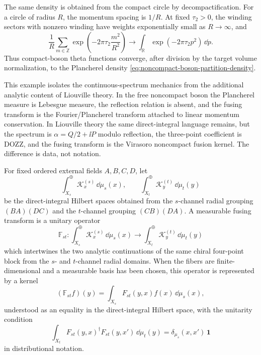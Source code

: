 The same density is obtained from the compact circle by decompactification.
For a circle of radius \(R\), the momentum spacing is \(1/R\).  At fixed
\(\tau_2>0\), the winding sectors with nonzero winding have weights
exponentially small as \(R\to\infty\), and
\[
  \frac1R\sum_{m\in\mathbb Z}
  \exp\!\left(-2\pi\tau_2\frac{m^2}{R^2}\right)
  \longrightarrow
  \int_{\mathbb R}\exp(-2\pi\tau_2p^2)\,\dd p .
\]
Thus compact-boson theta functions converge, after division by the target
volume normalization, to the Plancherel density
\eqref{eq:noncompact-boson-partition-density}.

This example isolates the continuous-spectrum mechanics from the additional
analytic content of Liouville theory.  In the free noncompact boson the
Plancherel measure is Lebesgue measure, the reflection relation is absent,
and the fusing transform is the Fourier/Plancherel transform attached to
linear momentum conservation.  In Liouville theory the same direct-integral
language remains, but the spectrum is
\(\alpha=Q/2+\ii P\) modulo reflection, the three-point coefficient is DOZZ,
and the fusing transform is the Virasoro noncompact fusion kernel.  The
difference is data, not notation.

\begin{definition}
\label{def:measurable-fusing-transform}
For fixed ordered external fields \(A,B,C,D\), let
\[
  \int_{X_s}^{\oplus}\mathcal K_x^{(s)}\,\dd\mu_s(x),
  \qquad
  \int_{X_t}^{\oplus}\mathcal K_y^{(t)}\,\dd\mu_t(y)
\]
be the direct-integral Hilbert spaces obtained from the \(s\)-channel
radial grouping \((BA)(DC)\) and the \(t\)-channel grouping \((CB)(DA)\).
A measurable fusing transform is a unitary operator
\begin{equation}
  \mathbb F_{st}:
  \int_{X_s}^{\oplus}\mathcal K_x^{(s)}\,\dd\mu_s(x)
  \longrightarrow
  \int_{X_t}^{\oplus}\mathcal K_y^{(t)}\,\dd\mu_t(y)
  \label{eq:measurable-fusing-transform}
\end{equation}
which intertwines the two analytic continuations of the same chiral
four-point block from the \(s\)- and \(t\)-channel radial domains.  When the
fibers are finite-dimensional and a measurable basis has been chosen, this
operator is represented by a kernel
\begin{equation}
  (\mathbb F_{st} f)(y)
  =
  \int_{X_s}
  F_{st}(y,x)f(x)\,\dd\mu_s(x),
  \label{eq:fusing-kernel-direct-integral}
\end{equation}
understood as an equality in the direct-integral Hilbert space, with the
unitarity condition
\begin{equation}
  \int_{X_t} F_{st}(y,x)^\dagger F_{st}(y,x')\,\dd\mu_t(y)
  =
  \delta_{\mu_s}(x,x')\,\mathbf 1
  \label{eq:fusing-kernel-unitarity}
\end{equation}
in distributional notation.
\end{definition}


